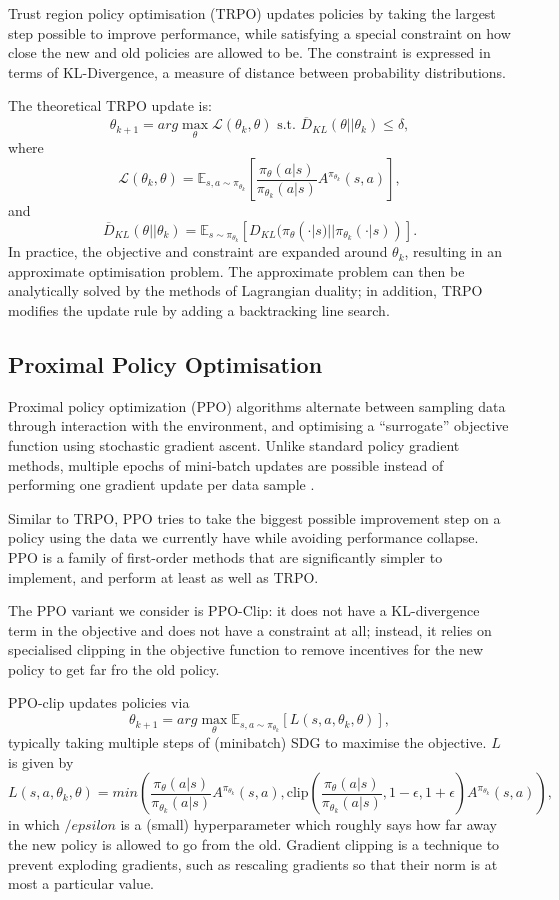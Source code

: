 \documentclass{article}
\begin{document}
Trust region policy optimisation (TRPO) updates policies by taking the largest step possible to improve performance, while satisfying a special constraint on how close the new and old policies are allowed to be. The constraint is expressed in terms of KL-Divergence, a measure of distance between probability distributions.

The theoretical TRPO update is: $$\theta_{k+1} = arg \max_\theta \mathcal{L}(\theta_k, \theta) \text{ s.t. } \overline{D}_{KL}(\theta || \theta_k) \leq \delta,$$ where $$\mathcal{L}(\theta_k, \theta) = \mathbb{E}_{s, a \sim \pi_{\theta_k}} \left[ \frac{\pi_\theta(a|s)}{\pi_{\theta_k}(a|s)} A^{\pi_{\theta_k}}(s,a) \right],$$ and $$ \overline{D}_{KL}(\theta||\theta_k) = \mathbb{E}_{s \sim \pi_{\theta_k}} \left[ D_{KL}(\pi_\theta(\cdot|s) || \pi_{\theta_k}(\cdot|s)) \right].$$ In practice, the objective and constraint are expanded around $\theta_k$, resulting in an approximate optimisation problem. The approximate problem can then be analytically solved by the methods of Lagrangian duality; in addition, TRPO modifies the update rule by adding a backtracking line search.  

\subsection{Proximal Policy Optimisation}

Proximal policy optimization (PPO) algorithms alternate between sampling data through interaction with the environment, and optimising a ``surrogate'' objective function using stochastic gradient ascent. Unlike standard policy gradient methods, multiple epochs of mini-batch updates are possible instead of performing one gradient update per data sample \cite{DBLP:journals/corr/SchulmanWDRK17}.

Similar to TRPO, PPO tries to take the biggest possible improvement step on a policy using the data we currently have while avoiding performance collapse. PPO is a family of first-order methods that are significantly simpler to implement, and perform at least as well as TRPO.

The PPO variant we consider is PPO-Clip: it does not have a KL-divergence term in the objective and does not have a constraint at all; instead, it relies on specialised clipping in the objective function to remove incentives for the new policy to get far fro the old policy.

PPO-clip updates policies via $$\theta_{k+1} = arg \max_\theta \mathbb{E}_{s,a \sim \pi_{\theta_k}} \left[ L(s,a,\theta_k,\theta) \right],$$ typically taking multiple steps of (minibatch) SDG to maximise the objective. $L$ is given by $$L(s,a,\theta_k,\theta) = min \left(\frac{\pi_\theta(a|s)}{\pi_{\theta_k}(a|s)} A^{\pi_{\theta_k}}(s,a), \text{clip} \left( \frac{\pi_\theta(a|s)}{\pi_{\theta_k}(a|s)}, 1 - \epsilon, 1 + \epsilon \right) A^{\pi_{\theta_k}}(s,a) \right),$$ in which $/epsilon$ is a (small) hyperparameter which roughly says how far away the new policy is allowed to go from the old. Gradient clipping is a technique to prevent exploding gradients, such as rescaling gradients so that their norm is at most a particular value. 
\end{document}

